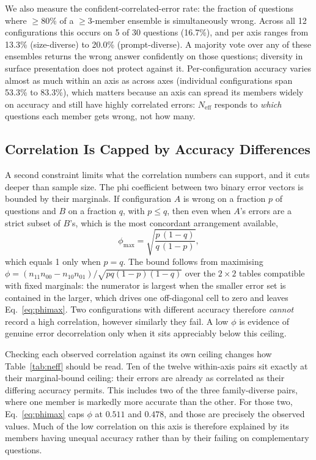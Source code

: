 \documentclass[conference]{IEEEtran}
\begin{document}
We also measure the confident-correlated-error rate: the fraction of
questions where $\geq$80\% of a $\geq$3-member ensemble is simultaneously
wrong. Across all 12 configurations this occurs on 5 of 30 questions
(16.7\%), and per axis ranges from 13.3\% (size-diverse) to 20.0\%
(prompt-diverse). A majority vote over any of these ensembles returns the
wrong answer confidently on those questions; diversity in surface
presentation does not protect against it. Per-configuration accuracy varies
almost as much within an axis as across axes (individual configurations span
53.3\% to 83.3\%), which matters because an axis can spread its members
widely on accuracy and still have highly correlated errors: $N_\text{eff}$
responds to \emph{which} questions each member gets wrong, not how many.

\subsection{Correlation Is Capped by Accuracy Differences}
\label{sec:marginalbound}
A second constraint limits what the correlation numbers can support, and it
cuts deeper than sample size. The phi coefficient between two binary error
vectors is bounded by their marginals. If configuration $A$ is wrong on a
fraction $p$ of questions and $B$ on a fraction $q$, with $p\leq q$, then
even when $A$'s errors are a strict subset of $B$'s, which is the most
concordant arrangement available,
\begin{equation}
\phi_{\max} = \sqrt{\frac{p\,(1-q)}{q\,(1-p)}},
\label{eq:phimax}
\end{equation}
which equals 1 only when $p=q$. The bound follows from maximising
$\phi = (n_{11}n_{00} - n_{10}n_{01})/\sqrt{pq(1-p)(1-q)}$ over the $2\times2$
tables compatible with fixed marginals: the numerator is largest when the
smaller error set is contained in the larger, which drives one off-diagonal
cell to zero and leaves Eq.~\ref{eq:phimax}. Two configurations with
different accuracy therefore \emph{cannot} record a high correlation,
however similarly they fail. A low $\phi$ is evidence of genuine error decorrelation only when it
sits appreciably below this ceiling.

Checking each observed correlation against its own ceiling changes how
Table~\ref{tab:neff} should be read. Ten of the twelve within-axis pairs sit
exactly at their marginal-bound ceiling: their errors are already as
correlated as their differing accuracy permits. This includes two of the
three family-diverse pairs, where one member is markedly more accurate than
the other. For those two, Eq.~\ref{eq:phimax} caps $\phi$ at $0.511$ and
$0.478$, and those are precisely the observed values. Much of the low
correlation on this axis is therefore explained by its members having unequal
accuracy rather than by their failing on complementary questions.
\end{document}
